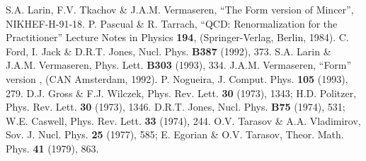 \documentclass[a4paper,11pt]{article}
\begin{document}
\begin{thebibliography}{99}
S.A. Larin, F.V. Tkachov \& J.A.M. Vermaseren, ``The Form version of Mincer'', 
NIKHEF-H-91-18.
 P. Pascual \& R. Tarrach, ``QCD: Renormalization for the 
Practitioner'' Lecture Notes in Physics {\bf 194}, (Springer-Verlag, Berlin, 
1984). 
 C. Ford, I. Jack \& D.R.T. Jones, Nucl. Phys. {\bf B387} (1992),
373. 
 S.A. Larin \& J.A.M. Vermaseren, Phys. Lett. {\bf B303} (1993), 
334. 
 J.A.M. Vermaseren, ``{\sc Form}'' version \coordHE{}, (CAN
Amsterdam, 1992).  
 P. Nogueira, J. Comput. Phys. {\bf 105} (1993), 279. 
 D.J. Gross \& F.J. Wilczek, Phys. Rev. Lett. {\bf 30}
(1973), 1343; 
H.D. Politzer, Phys. Rev. Lett. {\bf 30} (1973), 1346.
 D.R.T. Jones, Nucl. Phys. {\bf B75} (1974), 531; 
W.E. Caswell, Phys. Rev. Lett. {\bf 33} (1974), 244. 
 O.V. Tarasov \& A.A. Vladimirov, Sov. J. Nucl. Phys. {\bf 25} 
(1977), 585;  
E. Egorian \& O.V. Tarasov, Theor. Math. Phys. {\bf 41} (1979),
863. 
\end{thebibliography}
\end{document}

